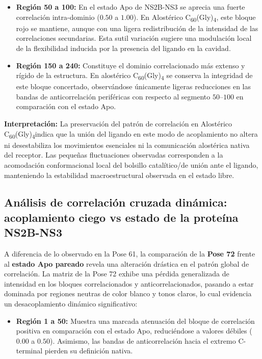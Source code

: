 \begin{table}[htbp]
\begin{itemize}
    \item \textbf{Región 50 a 100:} En el estado Apo de NS2B-NS3 se aprecia una fuerte correlación intra-dominio ($0.50$ a $1.00$). En Alostérico C\textsubscript{60}(Gly)\textsubscript{4}, este bloque rojo se mantiene, aunque con una ligera redistribución de la intensidad de las correlaciones secundarias. Esta sutil variación sugiere una modulación local de la flexibilidad inducida por la presencia del ligando en la cavidad.
    
    \item \textbf{Región 150 a 240:} Constituye el dominio correlacionado más extenso y rígido de la estructura. En alostérico C\textsubscript{60}(Gly)\textsubscript{4} se conserva la integridad de este bloque concertado, observándose únicamente ligeras reducciones en las bandas de anticorrelación periféricas con respecto al segmento $50$--$100$ en comparación con el estado Apo.
\end{itemize}

\textbf{Interpretación:} La preservación del patrón de correlación en Alostérico C\textsubscript{60}(Gly)\textsubscript{4}indica que la unión del ligando en este modo de acoplamiento no altera ni desestabiliza los movimientos esenciales ni la comunicación alostérica nativa del receptor. Las pequeñas fluctuaciones observadas corresponden a la acomodación conformacional local del bolsillo catalítico/de unión ante el ligando, manteniendo la estabilidad macroestructural observada en el estado libre.

\subsection*{Análisis de correlación cruzada dinámica: acoplamiento ciego vs estado de la proteína NS2B-NS3}

A diferencia de lo observado en la Pose 61, la comparación de la \textbf{Pose 72} frente al \textbf{estado Apo pareado} revela una alteración drástica en el patrón global de correlación. La matriz de la Pose 72 exhibe una pérdida generalizada de intensidad en los bloques correlacionados y anticorrelacionados, pasando a estar dominada por regiones neutras de color blanco y tonos claros, lo cual evidencia un desacoplamiento dinámico significativo:

\begin{itemize}
    \item \textbf{Región 1 a 50:} Muestra una marcada atenuación del bloque de correlación positiva en comparación con el estado Apo, reduciéndose a valores débiles ($0.00$ a $0.50$). Asimismo, las bandas de anticorrelación hacia el extremo C-terminal pierden su definición nativa.
    

\end{itemize}
\end{table}
